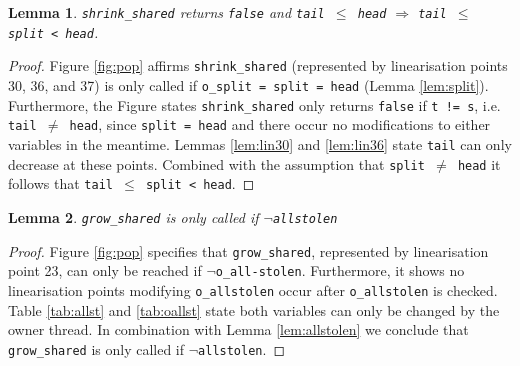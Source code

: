 \documentclass{sig-alternate-br}
\newtheorem{lemma}{Lemma}
\begin{document}
\begin{lemma}
	\texttt{shrink\_shared} returns \texttt{false} and \texttt{tail $\leq$ head} $\Rightarrow$ \texttt{tail $\leq$ split < head}.
	\label{lem:shrsh.var}
\end{lemma}
\begin{proof}
	Figure \ref{fig:pop} affirms \texttt{shrink\_shared} (represented by linearisation points 30, 36, and 37) is only called if \texttt{o\_split = split = head} (Lemma \ref{lem:split}).
	Furthermore, the Figure states \texttt{shrink\_shared} only returns \texttt{false} if \texttt{t != s}, i.e. \texttt{tail $\neq$ head}, since \texttt{split = head} and there occur no modifications to either variables in the meantime.
	Lemmas \ref{lem:lin30} and \ref{lem:lin36} state \texttt{tail} can only decrease at these points. 
	Combined with the assumption that \texttt{split $\neq$ head} it follows that \texttt{tail $\leq$ split < head}.
\end{proof}

\begin{lemma}
	\texttt{grow\_shared} is only called if \texttt{$\neg$allstolen}
	\label{lem:grshr}
\end{lemma}
\begin{proof}
	Figure \ref{fig:pop} specifies that \texttt{grow\_shared}, represented by linearisation point 23, can only be reached if \texttt{$\neg$o\_all-stolen}.
	Furthermore, it shows no linearisation points modifying \texttt{o\_allstolen} occur after \texttt{o\_allstolen} is checked.
	Table \ref{tab:allst} and \ref{tab:oallst} state both variables can only be changed by the owner thread.
	In combination with Lemma \ref{lem:allstolen} we conclude that \texttt{grow\_shared} is only called if $\neg$\texttt{allstolen}.
\end{proof}
\end{document}
